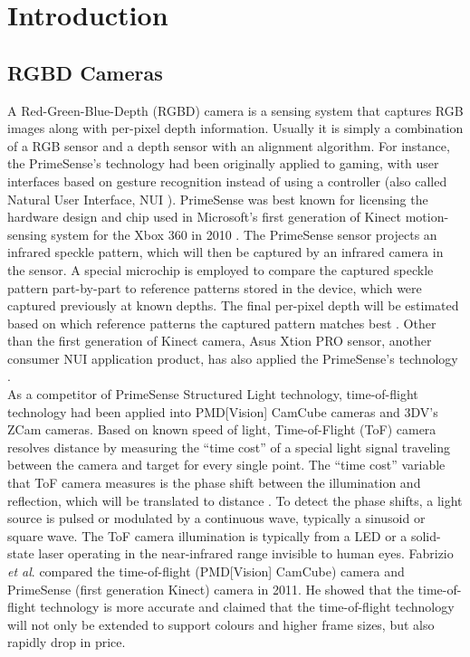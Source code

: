 \chapter{Introduction} %
\label{chapterIntroduction} 
\section{RGBD Cameras}
\indent
A Red-Green-Blue-Depth (\gls{RGBD}) camera is a sensing system that captures RGB images along with per-pixel depth information. Usually it is simply a combination of a RGB sensor and a depth sensor with an alignment algorithm. For instance, the PrimeSense's technology had been originally applied to gaming, with user interfaces based on gesture recognition instead of using a controller (also called Natural User Interface, \gls{NUI} \cite{BraveNUIworld_2011}). PrimeSense was best known for licensing the hardware design and chip used in Microsoft's first generation of Kinect motion-sensing system for the Xbox 360 in 2010 \cite{PrimeSenseInfo_2013}. The PrimeSense sensor projects an infrared speckle pattern, which will then be captured by an infrared camera in the sensor. A special microchip is employed to compare the captured speckle pattern part-by-part to reference patterns stored in the device, which were captured previously at known depths. The final per-pixel depth will be estimated based on which reference patterns the captured pattern matches best \cite{Krystof12}. Other than the first generation of Kinect camera, Asus Xtion PRO sensor, another consumer \gls{NUI} application product, has also applied the PrimeSense's technology \cite{AsusXtion_2013}.
\\\indent%
As a competitor \cite{evaluationBetween_2015} of PrimeSense Structured Light technology, time-of-flight technology had been applied into PMD[Vision] CamCube cameras and 3DV's ZCam cameras. Based on known speed of light, Time-of-Flight (\gls{ToF}) camera resolves distance by measuring the \enquote{time cost} of a special light signal traveling between the camera and target for every single point. The \enquote{time cost} variable that \gls{ToF} camera measures is the phase shift between the illumination and reflection, which will be translated to distance \cite{TimeOfFlight}. To detect the phase shifts, a light source is pulsed or modulated by a continuous wave, typically a sinusoid or square wave. The \gls{ToF} camera illumination is typically from a LED or a solid-state laser operating in the near-infrared range invisible to human eyes. Fabrizio \textit{et al}. \cite{depthTechCompare_2011} compared the time-of-flight (PMD[Vision] CamCube) camera and PrimeSense (first generation Kinect) camera in 2011. He showed that the time-of-flight technology is more accurate and claimed that the time-of-flight technology will not only be extended to support colours and higher frame sizes, but also rapidly drop in price. %
